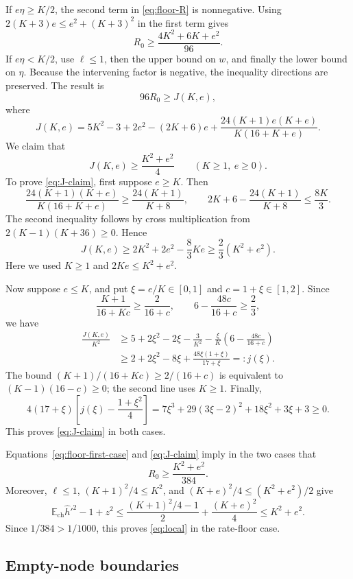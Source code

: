 \documentclass[11pt]{article}
\numberwithin{equation}{section}
\theoremstyle{remark}
\newcommand{\E}{\mathbb E}
\begin{document}
If \(e\eta\ge K/2\), the second term in \eqref{eq:floor-R} is
nonnegative. Using \(2(K+3)e\le e^2+(K+3)^2\) in the first term gives
\begin{equation}\label{eq:floor-first-case}
R_0\ge\frac{4K^2+6K+e^2}{96}.
\end{equation}
If \(e\eta<K/2\), use \(\ell\le1\), then the upper bound on \(w\), and
finally the lower bound on \(\eta\). Because the intervening factor is
negative, the inequality directions are preserved. The result is
\begin{equation}\label{eq:J-bound}
96R_0\ge J(K,e),
\end{equation}
where
\[
J(K,e)=5K^2-3+2e^2-(2K+6)e
+\frac{24(K+1)e(K+e)}{K(16+K+e)}.
\]
We claim that
\begin{equation}\label{eq:J-claim}
J(K,e)\ge\frac{K^2+e^2}{4}
\qquad(K\ge1,\ e\ge0).
\end{equation}
To prove \eqref{eq:J-claim}, first suppose \(e\ge K\). Then
\[
\frac{24(K+1)(K+e)}{K(16+K+e)}
\ge\frac{24(K+1)}{K+8},
\qquad
2K+6-\frac{24(K+1)}{K+8}\le\frac{8K}{3}.
\]
The second inequality follows by cross multiplication from
\(2(K-1)(K+36)\ge0\). Hence
\[
J(K,e)\ge2K^2+2e^2-\frac83Ke
\ge\frac23(K^2+e^2).
\]
Here we used \(K\ge1\) and \(2Ke\le K^2+e^2\).

Now suppose \(e\le K\), and put \(\xi=e/K\in[0,1]\) and
\(c=1+\xi\in[1,2]\). Since
\[
\frac{K+1}{16+Kc}\ge\frac2{16+c},
\qquad
6-\frac{48c}{16+c}\ge\frac23,
\]
we have
\begin{align*}
\frac{J(K,e)}{K^2}
&\ge5+2\xi^2-2\xi-\frac3{K^2}
 -\frac{\xi}{K}\left(6-\frac{48c}{16+c}\right)\\
&\ge2+2\xi^2-8\xi+\frac{48\xi(1+\xi)}{17+\xi}
=:j(\xi).
\end{align*}
The bound \((K+1)/(16+Kc)\ge2/(16+c)\) is equivalent to
\((K-1)(16-c)\ge0\); the second line uses \(K\ge1\).
Finally,
\[
4(17+\xi)\left[j(\xi)-\frac{1+\xi^2}{4}\right]
=7\xi^3+29(3\xi-2)^2+18\xi^2+3\xi+3\ge0.
\]
This proves \eqref{eq:J-claim} in both cases.


Equations~\eqref{eq:floor-first-case} and \eqref{eq:J-claim} imply in
the two cases that
\[
R_0\ge\frac{K^2+e^2}{384}.
\]
Moreover, \(\ell\le1\), \((K+1)^2/4\le K^2\), and
\((K+e)^2/4\le(K^2+e^2)/2\) give
\[
\E_{\mathrm{ch}}\widehat h'^2-1+z^2
\le\frac{(K+1)^2/4-1}{2}+\frac{(K+e)^2}{4}
\le K^2+e^2.
\]
Since \(1/384>1/1000\), this proves \eqref{eq:local} in the rate-floor
case.

\subsection{Empty-node boundaries}
\end{document}
